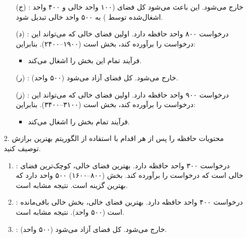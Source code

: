 \begin{enumerate}
	\item [ ]
	\begin{qsolve}
		\begin{enumerate}
			
			\item [(ج)] : خارج می‌شود. این باعث می‌شود کل فضای  (۱۰۰ واحد خالی و ۴۰۰ واحد اشغال‌شده توسط ) به ۵۰۰ واحد خالی تبدیل شود.
			
			\item [(د)] : درخواست ۸۰۰ واحد حافظه دارد. اولین فضای خالی که می‌تواند این درخواست را برآورده کند، بخش  است (۱۹۰۰–۲۴۰۰). بنابراین:
			\begin{itemize}
				\item فرآیند  تمام این بخش را اشغال می‌کند.
			\end{itemize}
			
			\item [(ر)] : خارج می‌شود. کل فضای  آزاد می‌شود (۵۰۰ واحد).
			
			\item [(ز)] : درخواست ۹۰۰ واحد حافظه دارد. اولین فضای خالی که می‌تواند این درخواست را برآورده کند، بخش  است (۳۱۰۰–۳۴۰۰). بنابراین:
			\begin{itemize}
				\item فرآیند  تمام بخش  را اشغال می‌کند.
			\end{itemize}
			
		\end{enumerate}
		
	\end{qsolve}
	
	
	
	\item [2.] محتویات حافظه را پس از هر اقدام با استفاده از الگوریتم بهترین برازش توصیف کنید.
	\begin{qsolve}
		\begin{enumerate}
			\item {}: درخواست ۳۰۰ واحد حافظه دارد. بهترین فضای خالی، کوچک‌ترین فضای خالی است که درخواست را برآورده کند. بخش  (۸۰۰–۱۶۰۰) ۵۰۰ واحد دارد که بهترین گزینه است. نتیجه مشابه \lr{First Fit} است.
			
			\item {}: درخواست ۴۰۰ واحد حافظه دارد. بهترین فضای خالی، بخش خالی باقی‌مانده  است (۵۰۰ واحد). نتیجه مشابه \lr{First Fit} است.
			
			\item {}: خارج می‌شود. کل فضای  آزاد می‌شود (۵۰۰ واحد).
			

\end{enumerate}
\end{qsolve}
\end{enumerate}
